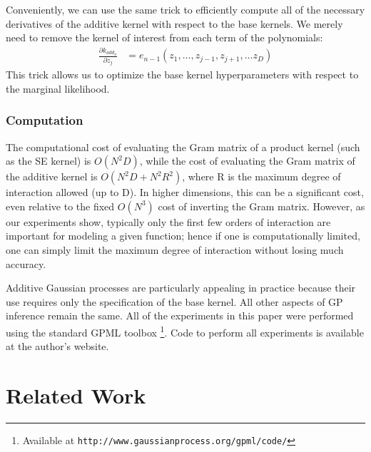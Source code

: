 Conveniently, we can use the same trick to efficiently compute all of the necessary derivatives of the additive kernel with respect to the base kernels.  We merely need to remove the kernel of interest from each term of the polynomials:
\begin{align}
\frac{\partial k_{add_n}}{\partial z_j} & = e_{n-1}(z_1,\dots,z_{j-1},z_{j+1}, \dots z_D)
\end{align}
This trick allows us to optimize the base kernel hyperparameters with respect to the marginal likelihood.

\subsubsection{Computation}
The computational cost of evaluating the Gram matrix of a product kernel (such as the SE kernel) is $O(N^2D)$, while the cost of evaluating the Gram matrix of the additive kernel is $O(N^2D + N^2R^2)$, where R is the maximum degree of interaction allowed (up to D).  In higher dimensions, this can be a significant cost, even relative to the fixed $O(N^3)$ cost of inverting the Gram matrix.
%
However, as our experiments show, typically only the first few orders of interaction are important for modeling a given function; hence if one is computationally limited, one can simply limit the maximum degree of interaction without losing much accuracy.

Additive Gaussian processes are particularly appealing in practice because their use requires only the specification of the base kernel.  All other aspects of GP inference remain the same.  All of the experiments in this paper were performed using the standard GPML toolbox \footnote{Available at \texttt{http://www.gaussianprocess.org/gpml/code/}}.  Code to perform all experiments is available at the author's website.


\section{Related Work}

